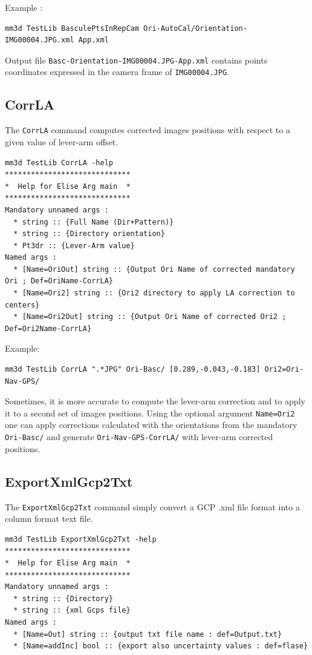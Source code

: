 Example :
\begin{verbatim}
mm3d TestLib BasculePtsInRepCam Ori-AutoCal/Orientation-IMG00004.JPG.xml App.xml
\end{verbatim}

Output file {\tt Basc-Orientation-IMG00004.JPG-App.xml} contains points coordinates expressed in the camera frame of {\tt IMG00004.JPG}.

\subsection{CorrLA}
The {\tt CorrLA} command computes corrected images positions with respect to a given value of lever-arm offset.

\begin{verbatim}
mm3d TestLib CorrLA -help
*****************************
*  Help for Elise Arg main  *
*****************************
Mandatory unnamed args : 
  * string :: {Full Name (Dir+Pattern)}
  * string :: {Directory orientation}
  * Pt3dr :: {Lever-Arm value}
Named args : 
  * [Name=OriOut] string :: {Output Ori Name of corrected mandatory Ori ; Def=OriName-CorrLA}
  * [Name=Ori2] string :: {Ori2 directory to apply LA correction to centers}
  * [Name=Ori2Out] string :: {Output Ori Name of corrected Ori2 ; Def=Ori2Name-CorrLA}
\end{verbatim}

Example:
\begin{verbatim}
mm3d TestLib CorrLA ".*JPG" Ori-Basc/ [0.289,-0.043,-0.183] Ori2=Ori-Nav-GPS/
\end{verbatim}

Sometimes, it is more accurate to compute the lever-arm correction and to apply it to a second set of images positions.
Using the optional argument {\tt Name=Ori2} one can apply corrections calculated with the orientations from the mandatory {\tt Ori-Basc/} and generate {\tt Ori-Nav-GPS-CorrLA/} with
lever-arm corrected positions. 

\subsection{ExportXmlGcp2Txt}
The {\tt ExportXmlGcp2Txt} command simply convert a GCP .xml file format into a column format text file.

\begin{verbatim}
mm3d TestLib ExportXmlGcp2Txt -help
*****************************
*  Help for Elise Arg main  *
*****************************
Mandatory unnamed args : 
  * string :: {Directory}
  * string :: {xml Gcps file}
Named args : 
  * [Name=Out] string :: {output txt file name : def=Output.txt}
  * [Name=addInc] bool :: {export also uncertainty values : def=flase}
\end{verbatim}

